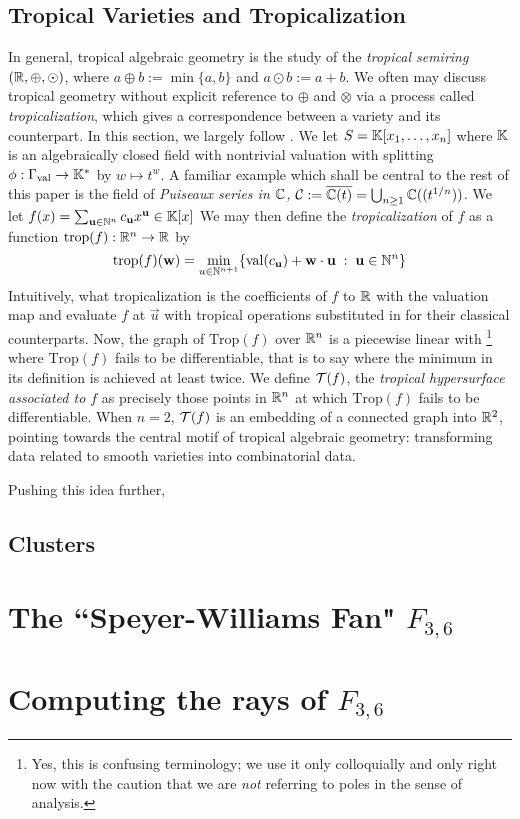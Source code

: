 \documentclass[12pt,letter]{article}
\newcommand{\trop}{\mathrm{Trop}}
\begin{document}
\subsection{Tropical Varieties and Tropicalization}
\label{deftrop}
In general, tropical algebraic geometry is the study of the \emph{tropical semiring} $({\mathbb R},\oplus,\odot)$, where $a\oplus b:=\min\{a,b\}$ and $a\odot b:=a+b$. We often may discuss tropical geometry without explicit reference to $\oplus$ and $\otimes$ via a process called \emph{tropicalization}, which gives a correspondence between a variety and its  counterpart. In this section, we largely follow \cite[\S3]{MaSt15}. 
We let $S={\mathbb K}[x_1,\hdots,x_n]$ where ${\mathbb K}$ is an algebraically closed field with nontrivial valuation with splitting $\phi:\Gamma_{\mathrm{val}}\to {\mathbb K}^*$ by $w\mapsto t^w$. A familiar example which shall be central to the rest of this paper is the field of \emph{Puiseaux series in ${\mathbb C}$,} ${\mathcal C}:=\overline{{\mathbb C}(t)}=\bigcup_{n\geq 1}{\mathbb C}((t^{1/n}))$. We let $f(x)=\sum_{\mathbf{u}\in {\mathbb N}^{n}}c_{\mathbf{u}}x^{\mathbf{u}}\in {\mathbb K}[x]$ We may then define the \emph{tropicalization} of $f$ as a function $\mathrm{trop}(f):{\mathbb R}^{n}\to {\mathbb R}$ by \begin{equation} \mathrm{trop}(f)(\mathbf{w})=\min_{u\in {\mathbb N}^{n+1}} \{\mathrm{val}(c_{\mathbf{u}})+\mathbf{w}\cdot\mathbf{u}\;:\;\mathbf{u}\in {\mathbb N}^{n}\}
\end{equation}
Intuitively, what tropicalization  is  the coefficients of $f$ to ${\mathbb R}$ with the valuation map and evaluate $f$ at $\vec{u}$ with tropical operations substituted in for their classical counterparts. Now, the graph of $\trop(f)$ over ${\mathbb R}^{n}$ is a piecewise linear  with \footnote{Yes, this is confusing terminology; we use it only colloquially and only right now with the caution that we are \emph{not} referring to poles in the sense of analysis.} where $\trop(f)$ fails to be differentiable, that is to say where the minimum in its definition is achieved at least twice. We define ${\mathcal T}(f)$, the \emph{tropical hypersurface associated to $f$} as precisely those points in ${\mathbb R}^{n}$ at which $\trop(f)$ fails to be differentiable. When $n=2$, ${\mathcal T}(f)$ is an embedding of a connected graph into ${\mathbb R}^2$, pointing towards the central motif of tropical algebraic geometry: transforming data related to smooth varieties into combinatorial data.

Pushing this idea further, 
 \subsection{Clusters}
\section{The ``Speyer-Williams Fan" $F_{3,6}$}
\section{Computing the rays of $F_{3,6}$}
\nocite{*}
\printbibliography
\end{document}

